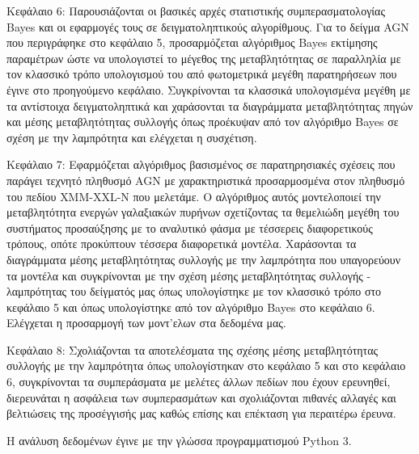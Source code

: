 Κεφάλαιο 6: Παρουσιάζονται οι βασικές αρχές στατιστικής συμπερασματολογίας \textlatin{Bayes} και οι εφαρμογές τους σε δειγματοληπτικούς αλγορίθμους. Για το δείγμα \textlatin{AGN} που περιγράφηκε στο κεφάλαιο 5, προσαρμόζεται αλγόριθμος \textlatin{Bayes} εκτίμησης παραμέτρων ώστε να υπολογιστεί το μέγεθος της μεταβλητότητας σε παραλληλία με τον κλασσικό τρόπο υπολογισμού του από φωτομετρικά μεγέθη παρατηρήσεων που έγινε στο προηγούμενο κεφάλαιο. Συγκρίνονται τα κλασσικά υπολογισμένα μεγέθη με τα αντίστοιχα δειγματοληπτικά και χαράσονται τα διαγράμματα μεταβλητότητας πηγών και μέσης μεταβλητότητας συλλογής όπως προέκυψαν από τον αλγόριθμο \textlatin{Bayes} σε σχέση με την λαμπρότητα και ελέγχεται η συσχέτιση. 

Κεφάλαιο 7: Εφαρμόζεται αλγόριθμος βασισμένος σε παρατηρησιακές σχέσεις που παράγει τεχνητό πληθυσμό \textlatin{AGN} με χαρακτηριστικά προσαρμοσμένα στον πληθυσμό του πεδίου \textlatin{XMM-XXL-N} που μελετάμε. Ο αλγόριθμος αυτός μοντελοποιεί την μεταβλητότητα ενεργών γαλαξιακών πυρήνων σχετίζοντας τα θεμελιώδη μεγέθη του συστήματος προσαύξησης με το αναλυτικό φάσμα με τέσσερεις διαφορετικούς τρόπους, οπότε προκύπτουν τέσσερα διαφορετικά μοντέλα. Χαράσονται τα διαγράμματα μέσης μεταβλητότητας συλλογής με την λαμπρότητα που υπαγορεύουν τα μοντέλα και συγκρίνονται με την σχέση μέσης μεταβλητότητας συλλογής - λαμπρότητας του δείγματός μας όπως υπολογίστηκε με τον κλασσικό τρόπο στο κεφάλαιο 5 και όπως υπολογίστηκε από τον αλγόριθμο \textlatin{Bayes} στο κεφάλαιο 6. Ελέγχεται η προσαρμογή των μοντ'ελων στα δεδομένα μας. 

Κεφάλαιο 8: Σχολιάζονται τα αποτελέσματα της σχέσης μέσης μεταβλητότητας συλλογής με την λαμπρότητα όπως υπολογίστηκαν στο κεφάλαιο 5 και στο κεφάλαιο 6, συγκρίνονται τα συμπεράσματα με μελέτες άλλων πεδίων που έχουν ερευνηθεί, διερευνάται η ασφάλεια των συμπερασμάτων και σχολιάζονται πιθανές αλλαγές και βελτιώσεις της προσέγγισής μας καθώς επίσης και επέκταση για περαιτέρω έρευνα.

Η ανάλυση δεδομένων έγινε με την γλώσσα προγραμματισμού \textlatin{Python 3}.
